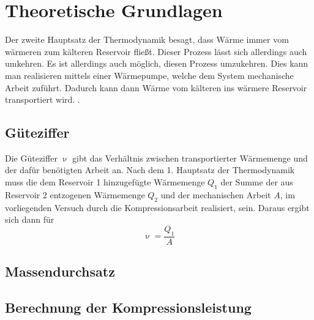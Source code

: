 \section{Theoretische Grundlagen}
\label{sec:Theorie}

Der zweite Hauptsatz der Thermodynamik besagt, dass Wärme immer vom wärmeren zum kälteren Reservoir fließt. Dieser Prozess lässt sich allerdings auch umkehren.
Es ist allerdings auch möglich, diesen Prozess umzukehren. Dies kann man realisieren mittels einer Wärmepumpe, welche dem System mechanische Arbeit zuführt. Dadurch kann dann
Wärme vom kälteren ins wärmere Reservoir transportiert wird.
.

\subsection {Güteziffer}
\label{sec:güteziffer}
Die Güteziffer $\upnu$ gibt das Verhältnis zwischen transportierter Wärmemenge und der dafür benötigten Arbeit an. Nach dem 1. Hauptsatz der Thermodynamik muss die dem Reservoir 1 hinzugefügte Wärmemenge $Q_1$
der Summe der aus Reservoir 2 entzogenen Wärmemenge $Q_2$ und der mechanischen Arbeit $A$, im vorliegenden Versuch durch die Kompressionsarbeit realisiert, sein.
Daraus ergibt sich dann für
\begin{equation}
  \upnu=\frac{Q_1}{A}
\end{equation}

\subsection {Massendurchsatz}
\label{sec:massendurchsatz}
\subsection {Berechnung der Kompressionsleistung}
\label{sec:kompressorleistung}









\cite{Anleitung}
